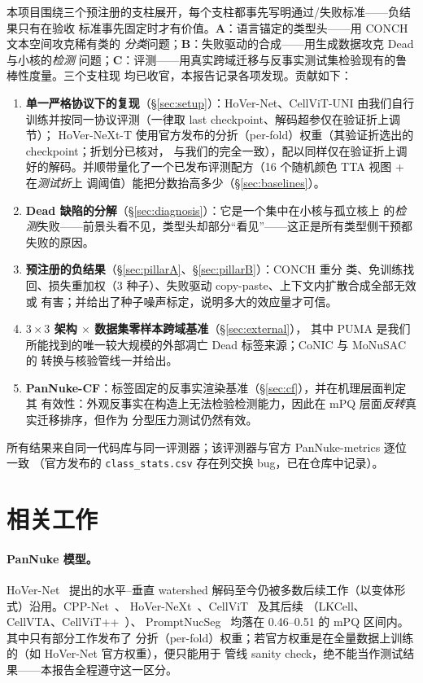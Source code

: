 \documentclass[11pt]{article}
\begin{document}
本项目围绕三个预注册的支柱展开，每个支柱都事先写明通过/失败标准——负结果只有在验收
标准事先固定时才有价值。\textbf{A}：语言锚定的类型头——用 CONCH 文本空间攻克稀有类的
\emph{分类}问题；\textbf{B}：失败驱动的合成——用生成数据攻克 Dead 与小核的\emph{检测}
问题；\textbf{C}：评测——用真实跨域迁移与反事实测试集检验现有的鲁棒性度量。三个支柱现
均已收官，本报告记录各项发现。贡献如下：

\begin{enumerate}
\item \textbf{单一严格协议下的复现}（\S\ref{sec:setup}）：HoVer-Net、CellViT-UNI
由我们自行训练并按同一协议评测（一律取 last checkpoint、解码超参仅在验证折上调节）；
HoVer-NeXt-T 使用官方发布的分折（per-fold）权重（其验证折选出的 checkpoint；折划分已核对，
与我们的完全一致），配以同样仅在验证折上调好的解码。并顺带量化了一个已发布评测配方（16 个随机颜色 TTA 视图 + 在\emph{测试折}上
调阈值）能把分数抬高多少（\S\ref{sec:baselines}）。
\item \textbf{Dead 缺陷的分解}（\S\ref{sec:diagnosis}）：它是一个集中在小核与孤立核上
的\emph{检测}失败——前景头看不见，类型头却部分“看见”——这正是所有类型侧干预都失败的原因。
\item \textbf{预注册的负结果}（\S\ref{sec:pillarA}、\S\ref{sec:pillarB}）：CONCH 重分
类、免训练找回、损失重加权（3 种子）、失败驱动 copy-paste、上下文内扩散合成全部无效或
有害；并给出了种子噪声标定，说明多大的效应量才可信。
\item \textbf{$3{\times}3$ 架构 $\times$ 数据集零样本跨域基准}（\S\ref{sec:external}），
其中 PUMA 是我们所能找到的唯一较大规模的外部凋亡 Dead 标签来源；CoNIC 与 MoNuSAC 的
转换与核验管线一并给出。
\item \textbf{PanNuke-CF}：标签固定的反事实渲染基准（\S\ref{sec:cf}），并在机理层面判定其
有效性：外观反事实在构造上无法检验检测能力，因此在 mPQ 层面\emph{反转}真实迁移排序，但作为
分型压力测试仍然有效。
\end{enumerate}

所有结果来自同一代码库与同一评测器；该评测器与官方 PanNuke-metrics 逐位一致
（官方发布的 \texttt{class\_stats.csv} 存在列交换 bug，已在仓库中记录）。

\section{相关工作}
\label{sec:related}

\paragraph{PanNuke 模型。}HoVer-Net~\cite{graham2019hovernet} 提出的水平--垂直
watershed 解码至今仍被多数后续工作（以变体形式）沿用。CPP-Net~\cite{cppnet}、
HoVer-NeXt~\cite{hovenext}、CellViT~\cite{horta2024cellvit} 及其后续
（LKCell、CellVTA、CellViT++~\cite{horta2025cellvitpp}）、
PromptNucSeg~\cite{promptnucseg} 均落在 0.46--0.51 的 mPQ 区间内。其中只有部分工作发布了
分折（per-fold）权重；若官方权重是在全量数据上训练的（如 HoVer-Net 官方权重），便只能用于
管线 sanity check，绝不能当作测试结果——本报告全程遵守这一区分。
\end{document}
